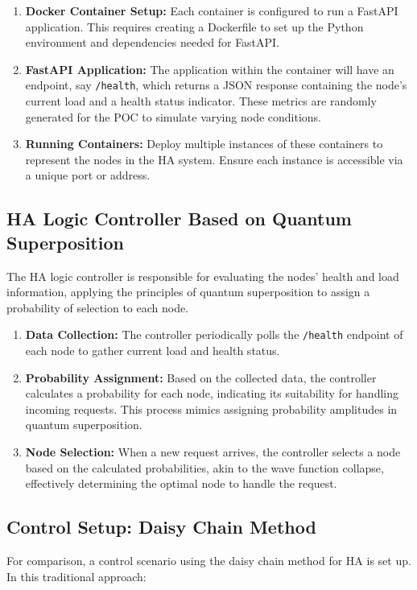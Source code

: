 \documentclass[12pt]{article}
\begin{document}
\begin{enumerate}
    \item \textbf{Docker Container Setup:} Each container is configured to run a FastAPI application. This requires creating a Dockerfile to set up the Python environment and dependencies needed for FastAPI.
    \item \textbf{FastAPI Application:} The application within the container will have an endpoint, say \texttt{/health}, which returns a JSON response containing the node's current load and a health status indicator. These metrics are randomly generated for the POC to simulate varying node conditions.
    \item \textbf{Running Containers:} Deploy multiple instances of these containers to represent the nodes in the HA system. Ensure each instance is accessible via a unique port or address.
\end{enumerate}

\subsection{HA Logic Controller Based on Quantum Superposition}
The HA logic controller is responsible for evaluating the nodes' health and load information, applying the principles of quantum superposition to assign a probability of selection to each node.

\begin{enumerate}
    \item \textbf{Data Collection:} The controller periodically polls the \texttt{/health} endpoint of each node to gather current load and health status.
    \item \textbf{Probability Assignment:} Based on the collected data, the controller calculates a probability for each node, indicating its suitability for handling incoming requests. This process mimics assigning probability amplitudes in quantum superposition.
    \item \textbf{Node Selection:} When a new request arrives, the controller selects a node based on the calculated probabilities, akin to the wave function collapse, effectively determining the optimal node to handle the request.
\end{enumerate}

\subsection{Control Setup: Daisy Chain Method}
For comparison, a control scenario using the daisy chain method for HA is set up. In this traditional approach:
\end{document}
